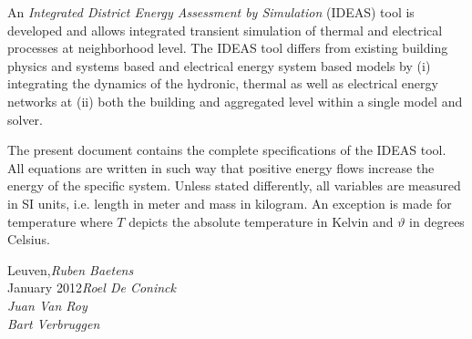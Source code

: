 %
%

\preface

An \textit{Integrated District Energy Assessment by Simulation} (IDEAS) tool is developed and allows integrated transient simulation of thermal and electrical processes at neighborhood
level. The IDEAS tool differs from existing building physics and systems based and electrical energy system based models by (i) integrating the dynamics of the hydronic, thermal as well as electrical energy networks at (ii) both the building and aggregated level within a single model and solver.

The present document contains the complete specifications of the IDEAS tool. All equations are written in such way that positive energy flows increase the energy of the specific system. Unless stated differently, all variables are measured in SI units, i.e. length in meter and mass in kilogram. An exception is made for temperature where $T$ depicts the absolute temperature in Kelvin and $\vartheta$ in degrees Celsius.
 
\vspace{\baselineskip}
\begin{flushright}\noindent
Leuven,\hfill {\it Ruben Baetens}\\
January 2012\hfill {\it Roel De Coninck}\\
 \hfill {\it Juan Van Roy}\\
 \hfill {\it Bart Verbruggen}\\
\end{flushright}


